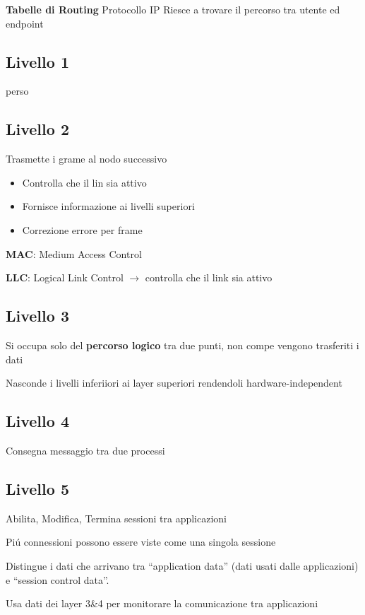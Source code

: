 \documentclass{article}
\begin{document}
\textbf{Tabelle di Routing} Protocollo IP Riesce a trovare il percorso tra utente ed endpoint

\subsection{Livello 1}
perso


\subsection{Livello 2}
Trasmette i grame al nodo successivo
\begin{itemize}
    \item Controlla che il lin sia attivo
    \item Fornisce informazione ai livelli superiori
    \item Correzione errore per frame
\end{itemize}

\textbf{MAC}: Medium Access Control

\textbf{LLC}: Logical Link Control $\rightarrow$ controlla che il link sia attivo


\subsection{Livello 3}
Si occupa solo del \textbf{percorso logico} tra due punti, non compe vengono trasferiti i dati

Nasconde i livelli inferiiori ai layer superiori rendendoli hardware-independent

\subsection{Livello 4}
Consegna messaggio tra due processi

\subsection{Livello 5}
Abilita, Modifica, Termina sessioni tra applicazioni

Pi\'u connessioni possono essere viste come una singola sessione

Distingue i dati che arrivano tra ``application data'' (dati usati dalle applicazioni) e ``session control data''.

Usa dati dei layer 3\&4 per monitorare la comunicazione tra applicazioni
\end{document}
